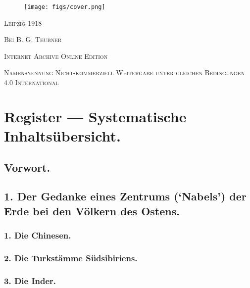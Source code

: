 \documentclass[a4paper, 11pt, oneside]{article}
\begin{document}
\begin{titlepage}
        \vspace*{\fill}

        \begin{figure}[H]
        \centering
        \texttt{[image: figs/cover.png]}
        \end{figure}

	\vspace{1\baselineskip}

        \vspace*{\fill}

	{\small\scshape Leipzig 1918}
	
	{\small\scshape{Bei B. G. Teubner}}
 
	\vspace{0.5\baselineskip} %

        \scshape Internet Archive Online Edition  %
	
	{\scshape\small Namensnennung Nicht-kommerziell Weitergabe unter gleichen Bedingungen 4.0 International} %
\end{titlepage}
\setlength{\parskip}{1mm plus1mm minus1mm}
\clearpage
\pagestyle{fancy}
\fancyhf{}
\cfoot{\frakfamily{\thepage}}
\Large
\tableofcontents
\clearpage
\section*{Register --- Systematische Inhaltsübersicht.}
\subsection*{Vorwort.}
\subsection*{1. Der Gedanke eines Zentrums (`Nabels') der Erde bei den Völkern des Ostens.}
\subsubsection*{1. Die Chinesen.}
\subsubsection*{2. Die Turkstämme Südsibiriens.}
\subsubsection*{3. Die Inder.}
\end{document}
